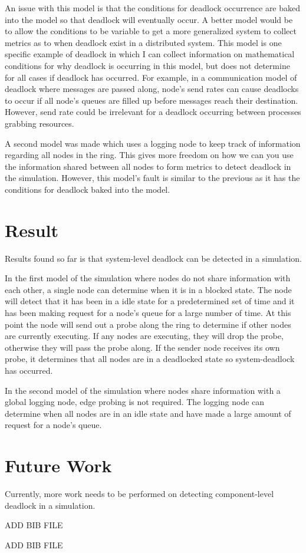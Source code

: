 \documentclass{article}
\begin{document}
An issue with this model is that the conditions for deadlock occurrence are baked into the model so that deadlock will eventually occur. A better model would be to allow the conditions to be variable to get a more generalized system to collect metrics as to when deadlock exist in a distributed system. This model is one specific example of deadlock in which I can collect information on mathematical conditions for why deadlock is occurring in this model, but does not determine for all cases if deadlock has occurred. For example, in a communication model of deadlock where messages are passed along, node's send rates can cause deadlocks to occur if all node's queues are filled up before messages reach their destination. However, send rate could be irrelevant for a deadlock occurring between processes grabbing resources. 

A second model was made which uses a logging node to keep track of information regarding all nodes in the ring. This gives more freedom on how we can you use the information shared between all nodes to form metrics to detect deadlock in the simulation. However, this model's fault is similar to the previous as it has the conditions for deadlock baked into the model.

\section{Result} %

Results found so far is that system-level deadlock can be detected in a simulation. 

In the first model of the simulation where nodes do not share information with each other, a single node can determine when it is in a blocked state. The node will detect that it has been in a idle state for a predetermined set of time and it has been making request for a node's queue for a large number of time. At this point the node will send out a probe along the ring to determine if other nodes are currently executing. If any nodes are executing, they will drop the probe, otherwise they will pass the probe along. If the sender node receives its own probe, it determines that all nodes are in a deadlocked state so system-deadlock has occurred.

In the second model of the simulation where nodes share information with a global logging node, edge probing is not required. The logging node can determine when all nodes are in an idle state and have made a large amount of request for a node's queue.

\section{Future Work}
Currently, more work needs to be performed on detecting component-level deadlock in a simulation.

\begin{thebibliography}{9}
ADD BIB FILE


ADD BIB FILE
\end{thebibliography}
\end{document}
